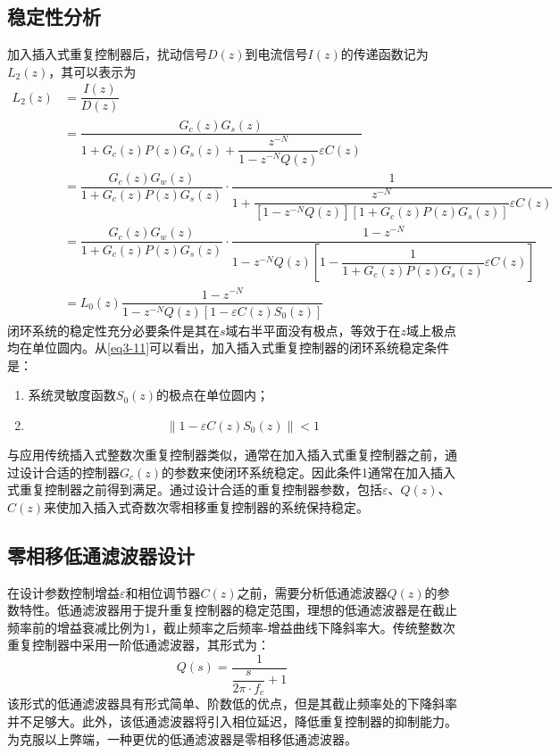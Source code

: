 \subsection{稳定性分析}
加入插入式重复控制器后，扰动信号$D(z)$到电流信号$I(z)$的传递函数记为$L_2(z)$，其可以表示为
\begin{equation}
\label{eq3-11}
\begin{aligned}
L_2(z)
&=\dfrac{I(z)}{D(z)}\\
&=\dfrac{G_c(z)G_s(z)}{1+G_c(z)P(z)G_s(z)+\dfrac{z^{-N}}{1-z^{-N}Q(z)}\varepsilon C(z)}\\
&=\dfrac{G_c(z)G_w(z)}{1+G_c(z)P(z)G_s(z)}\cdot \dfrac{1}{1+\dfrac{z^{-N}}{[1-z^{-N}Q(z)][1+G_c(z)P(z)G_s(z)]}\varepsilon C(z)}\\
&=\dfrac{G_c(z)G_w(z)}{1+G_c(z)P(z)G_s(z)}\cdot \dfrac{1-z^{-N}}{1-z^{-N}Q(z)\left[1-\dfrac{1}{1+G_c(z)P(z)G_s(z)}\varepsilon C(z)\right]}\\
&=L_0(z)\dfrac{1-z^{-N}}{1-z^{-N}Q(z)[1-\varepsilon C(z)S_0(z)]}
\end{aligned}
\end{equation}
闭环系统的稳定性充分必要条件是其在$s$域右半平面没有极点，等效于在$z$域上极点均在单位圆内。从\autoref{eq3-11}可以看出，加入插入式重复控制器的闭环系统稳定条件是：
\begin{enumerate}
	\item 系统灵敏度函数$S_0(z)$的极点在单位圆内；
	\item 
	\begin{equation}
		\label{eq_stable_odd}
		\left\|1 - \varepsilon C(z)S_0(z) \right\| < 1
	\end{equation}
\end{enumerate}
与应用传统插入式整数次重复控制器类似，通常在加入插入式重复控制器之前，通过设计合适的控制器$G_c(z)$的参数来使闭环系统稳定。因此条件1通常在加入插入式重复控制器之前得到满足。通过设计合适的重复控制器参数，包括$\varepsilon$、$Q(z)$、$C(z)$来使加入插入式奇数次零相移重复控制器的系统保持稳定。
\subsection{零相移低通滤波器设计}
在设计参数控制增益$\varepsilon$和相位调节器$C(z)$之前，需要分析低通滤波器$Q(z)$的参数特性。低通滤波器用于提升重复控制器的稳定范围，理想的低通滤波器是在截止频率前的增益衰减比例为1，截止频率之后频率-增益曲线下降斜率大。传统整数次重复控制器中采用一阶低通滤波器，其形式为：
\begin{equation}
Q(s)=\dfrac{1}{\dfrac{s}{2\pi\cdot f_c}+1}
\end{equation}
该形式的低通滤波器具有形式简单、阶数低的优点，但是其截止频率处的下降斜率并不足够大。此外，该低通滤波器将引入相位延迟，降低重复控制器的抑制能力。为克服以上弊端，一种更优的低通滤波器是零相移低通滤波器。

